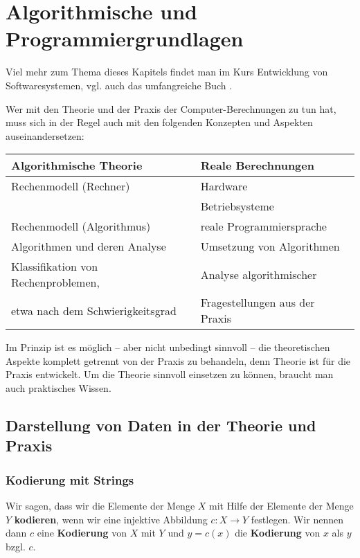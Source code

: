 \chapter{Algorithmische und Programmiergrundlagen}


\begin{bem} 
Viel mehr zum Thema dieses Kapitels findet man im Kurs Entwicklung von Softwaresystemen, vgl. auch das umfangreiche Buch \cite{GS11}. 
\end{bem} 

\begin{bem} Wer mit den Theorie und der Praxis der  Computer-Berechnungen zu tun hat, muss sich in der Regel auch mit den folgenden Konzepten und Aspekten auseinandersetzen: 
	\begin{center} 
			\begin{tabular}{l|l} 
				Algorithmische Theorie& Reale Berechnungen 
				\\ \hline\hline 
				Rechenmodell (Rechner) & Hardware 
				\\  & Betriebsysteme 
				\\  Rechenmodell (Algorithmus) & reale Programmiersprache 
				\\ \hline Algorithmen und deren Analyse & Umsetzung von Algorithmen
				\\ \hline Klassifikation von Rechenproblemen, & Analyse algorithmischer 
				\\ etwa nach dem Schwierigkeitsgrad  & Fragestellungen aus der Praxis 
			\end{tabular} 
	\end{center} 
	Im Prinzip ist es möglich -- aber nicht unbedingt sinnvoll -- die theoretischen Aspekte komplett getrennt von der Praxis zu behandeln, denn Theorie ist für die Praxis entwickelt. Um die Theorie sinnvoll einsetzen zu können, braucht man auch praktisches Wissen. 
\end{bem} 

\section{Darstellung von Daten in der Theorie und Praxis} 

\subsection{Kodierung mit Strings} 

\begin{defn}
Wir sagen, dass wir die Elemente der  Menge $X$ mit Hilfe der Elemente der Menge $Y$ \textbf{kodieren}, wenn wir eine  injektive Abbildung $c : X \to Y$ festlegen. Wir nennen dann $c$ eine \textbf{Kodierung} von $X$ mit $Y$ und $y=c(x)$ die \textbf{Kodierung} von $x$ als $y$ bzgl. $c$.  
\end{defn}

